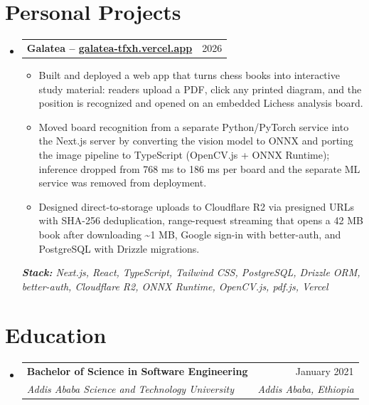 \documentclass[letterpaper,11pt]{article}
\makeatletter
\newcommand{\resumeItem}[1]{%
  \item \small{#1}
}
\newcommand{\resumeSubheading}[4]{%
  \item
  \begin{tabular*}{\textwidth}[t]
    {l@{\extracolsep{\fill}}r}
    \textbf{#1} & \small #2 \\
    \textit{\small #3} & \textit{\small #4}
  \end{tabular*}
}
\newcommand{\resumeProjectHeading}[2]{%
  \item
  \begin{tabular*}{\textwidth}
    {l@{\extracolsep{\fill}}r}
    \small \textbf{#1} & \small #2
  \end{tabular*}
}
\newcommand{\resumeSubHeadingListStart}{
  \begin{itemize}[leftmargin=0pt,label={},itemsep=12pt]
}
\newcommand{\resumeSubHeadingListEnd}{
  \end{itemize}
}
\newcommand{\resumeItemListStart}{
  \begin{itemize}[
    leftmargin=18pt,
    itemsep=5pt,
    parsep=2pt,
    topsep=5pt
  ]
}
\newcommand{\resumeItemListEnd}{
  \end{itemize}
}
\makeatother
\begin{document}
\section{Personal Projects}

\resumeSubHeadingListStart

  \resumeProjectHeading
    {Galatea -- \href{https://galatea-tfxh.vercel.app/}{galatea-tfxh.vercel.app}}{2026}

  \resumeItemListStart
    \resumeItem{Built and deployed a web app that turns chess books into interactive study material:
      readers upload a PDF, click any printed diagram, and the position is recognized and opened
      on an embedded Lichess analysis board.}

    \resumeItem{Moved board recognition from a separate Python/PyTorch service into the Next.js
      server by converting the vision model to ONNX and porting the image pipeline to TypeScript
      (OpenCV.js + ONNX Runtime); inference dropped from 768 ms to 186 ms per board and the
      separate ML service was removed from deployment.}

    \resumeItem{Designed direct-to-storage uploads to Cloudflare R2 via presigned URLs with SHA-256
      deduplication, range-request streaming that opens a 42 MB book after downloading
      \textasciitilde1 MB, Google sign-in with better-auth, and PostgreSQL with Drizzle migrations.}
  \resumeItemListEnd

  \textit{\small\textbf{Stack:} Next.js, React, TypeScript, Tailwind CSS, PostgreSQL, Drizzle ORM,
    better-auth, Cloudflare R2, ONNX Runtime, OpenCV.js, pdf.js, Vercel}

\resumeSubHeadingListEnd

\section{Education}

\resumeSubHeadingListStart

  \resumeSubheading
    {Bachelor of Science in Software Engineering}{January 2021}
    {Addis Ababa Science and Technology University}{Addis Ababa, Ethiopia}

\resumeSubHeadingListEnd
\end{document}
